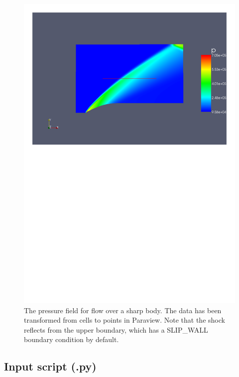 \begin{figure}[htbp]
\begin{center}
\includegraphics[width=\textwidth, viewport=24 446 570 818]{../2D/sharp/sharp_p.pdf}
\end{center}
\caption{The pressure field for flow over a sharp body.
    The data has been transformed from cells to points in Paraview.
    Note that the shock reflects from the upper boundary,
    which has a SLIP\_WALL boundary condition by default.}
\label{sharp-p-fig}
\end{figure}

\newpage

\subsection{Input script (.py)}
\topbar

\bottombar



